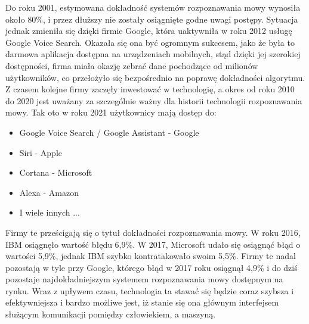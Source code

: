 \documentclass[12pt, a4paper]{article}
\begin{document}
\begin{sloppypar}
{{    Do roku 2001, estymowana dokładność systemów rozpoznawania mowy wynosiła około 80\%,
    i przez dłuższy nie zostały osiągnięte godne uwagi postępy. Sytuacja jednak
    zmieniła się dzięki firmie Google, która uaktywniła w roku 2012 usługę Google 
    Voice Search. Okazała się ona być ogromnym sukcesem, jako że była to darmowa 
    aplikacja dostępna na urządzeniach mobilnych, stąd dzięki jej szerokiej dostępności,
    firma miała okazję zebrać dane pochodzące od milionów użytkowników, co przełożyło
    się bezpośrednio na poprawę dokładności algorytmu. Z czasem kolejne firmy
    zaczęły inwestować w technologię, a okres od roku 2010 do 2020 jest uważany za
    szczególnie ważny dla historii technologii rozpoznawania mowy. Tak oto w roku 2021
    użytkownicy mają dostęp do:
    \begin{itemize}
      \item Google Voice Search / Google Assistant - Google 
      \item Siri - Apple
      \item Cortana - Microsoft
      \item Alexa - Amazon
      \item I wiele innych ...
    \end{itemize}
    Firmy te prześcigają się o tytuł dokładności rozpoznawania mowy. W roku 2016, IBM
    osiągnęło wartość błędu 6,9\%. W 2017, Microsoft udało się osiągnąć błąd o
    wartości 5,9\%, jednak IBM szybko kontratakowało swoim 5,5\%. Firmy te
    nadal pozostają w tyle przy Google, którego błąd w 2017 roku osiągnął 4,9\% i do
    dziś pozostaje najdokładniejszym systemem rozpoznawania mowy dostępnym na rynku.
    Wraz z upływem czasu, technologia ta stawać się będzie coraz szybsza i
    efektywniejsza i bardzo możliwe jest, iż stanie się ona głównym interfejsem służącym
    komunikacji pomiędzy człowiekiem, a maszyną. 

}}
\end{sloppypar}
\end{document}
